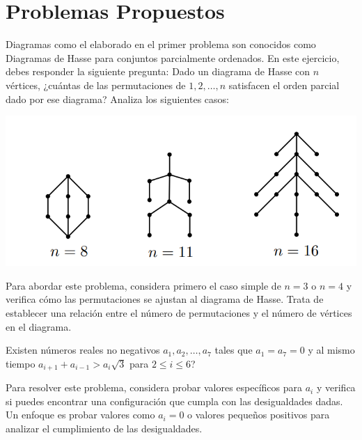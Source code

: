 \documentclass[11pt]{scrartcl}
\begin{document}
\section{Problemas Propuestos}

\begin{problem}
Diagramas como el elaborado en el primer problema son conocidos como Diagramas de Hasse para conjuntos parcialmente ordenados. En este ejercicio, debes responder la siguiente pregunta: Dado un diagrama de Hasse con \( n \) vértices, ¿cuántas de las permutaciones de \( 1, 2, \dots, n \) satisfacen el orden parcial dado por ese diagrama? Analiza los siguientes casos:
\begin{center}
    \includegraphics[scale=.75]{images/clase_14-hasse.png}
\end{center}
\begin{hint}
Para abordar este problema, considera primero el caso simple de \( n = 3 \) o \( n = 4 \) y verifica cómo las permutaciones se ajustan al diagrama de Hasse. Trata de establecer una relación entre el número de permutaciones y el número de vértices en el diagrama.
\end{hint}
\end{problem}

\begin{problem}
Existen números reales no negativos \( a_1, a_2, \dots, a_7 \) tales que \( a_1 = a_7 = 0 \) y al mismo tiempo \( a_{i+1} + a_{i-1} > a_i \sqrt{3} \) para \( 2 \leq i \leq 6 \)?
\begin{hint}
    Para resolver este problema, considera probar valores específicos para \( a_i \) y verifica si puedes encontrar una configuración que cumpla con las desigualdades dadas. Un enfoque es probar valores como \( a_i = 0 \) o valores pequeños positivos para analizar el cumplimiento de las desigualdades.
\end{hint}
\end{problem}
\end{document}
